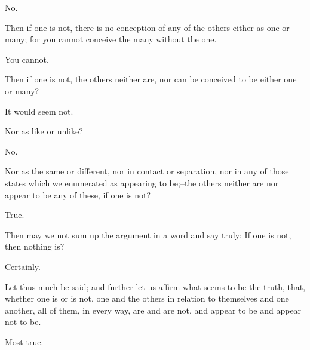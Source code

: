 No.

Then if one is not, there is no conception of any of the others either
as one or many; for you cannot conceive the many without the one.

You cannot.

Then if one is not, the others neither are, nor can be conceived to be
either one or many?

It would seem not.

Nor as like or unlike?

No.

Nor as the same or different, nor in contact or separation, nor in any
of those states which we enumerated as appearing to be;--the others
neither are nor appear to be any of these, if one is not?

True.

Then may we not sum up the argument in a word and say truly: If one is
not, then nothing is?

Certainly.

Let thus much be said; and further let us affirm what seems to be the
truth, that, whether one is or is not, one and the others in relation to
themselves and one another, all of them, in every way, are and are not,
and appear to be and appear not to be.

Most true.




